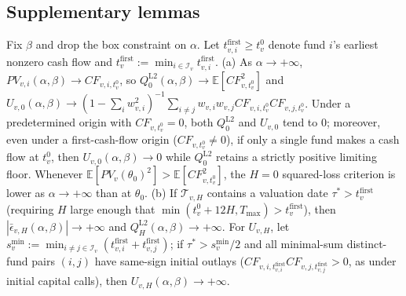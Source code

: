 \subsection{Supplementary lemmas}
\label{sec:supplementary_lemmas}

\begin{lemma}[Large-$\alpha$ attenuation at $H=0$ versus coercivity at sufficiently late $H>0$]
\label{lem:coercivity}
Fix $\beta$ and drop the box constraint on $\alpha$. Let $t_{v,i}^{\mathrm{first}} \ge t_v^0$ denote fund $i$'s earliest nonzero cash flow and $t_v^{\mathrm{first}} := \min_{i \in \mathcal{I}_v} t_{v,i}^{\mathrm{first}}$.
(a) As $\alpha \to +\infty$, $PV_{v,i}(\alpha,\beta) \to CF_{v,i,t_v^0}$, so $Q_0^{\mathrm{L2}}(\alpha,\beta) \to \mathbb{E}[CF_{v,t_v^0}^2]$ and $U_{v,0}(\alpha,\beta) \to (1 - \sum_i w_{v,i}^2)^{-1}\sum_{i \neq j} w_{v,i} w_{v,j} CF_{v,i,t_v^0} CF_{v,j,t_v^0}$. Under a predetermined origin with $CF_{v,t_v^0} = 0$, both $Q_0^{\mathrm{L2}}$ and $U_{v,0}$ tend to $0$; moreover, even under a first-cash-flow origin ($CF_{v,t_v^0} \neq 0$), if only a single fund makes a cash flow at $t_v^0$, then $U_{v,0}(\alpha,\beta) \to 0$ while $Q_0^{\mathrm{L2}}$ retains a strictly positive limiting floor. Whenever $\mathbb{E}[PV_v(\theta_0)^2] > \mathbb{E}[CF_{v,t_v^0}^2]$, the $H=0$ squared-loss criterion is lower as $\alpha \to +\infty$ than at $\theta_0$.
(b) If $\mathcal{T}_{v,H}$ contains a valuation date $\tau^\ast > t_v^{\mathrm{first}}$ (requiring $H$ large enough that $\min(t_v^0 + 12H, T_{\max}) > t_v^{\mathrm{first}}$), then $|\bar\epsilon_{v,H}(\alpha,\beta)| \to +\infty$ and $Q_H^{\mathrm{L2}}(\alpha,\beta) \to +\infty$. For $U_{v,H}$, let $s_v^{\min} := \min_{i \neq j \in \mathcal{I}_v}(t_{v,i}^{\mathrm{first}} + t_{v,j}^{\mathrm{first}})$; if $\tau^\ast > s_v^{\min}/2$ and all minimal-sum distinct-fund pairs $(i,j)$ have same-sign initial outlays ($CF_{v,i,t_{v,i}^{\mathrm{first}}} CF_{v,j,t_{v,j}^{\mathrm{first}}} > 0$, as under initial capital calls), then $U_{v,H}(\alpha,\beta) \to +\infty$.
\end{lemma}

